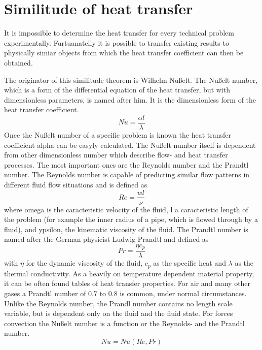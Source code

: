 \section{Similitude of heat transfer}
It is impossible to determine the heat transfer for every technical problem experimentally. Furtuanatelly it is possible to transfer existing results to physically simiar objects from which the heat transfer coefficient can then be obtained.

The originator of this similitude theorem is Wilhelm Nußelt. The Nußelt number, which is a form of the differential equation of the heat transfer, but with dimensionless parameters, is named after him. It is the dimensionless form of the heat transfer coefficient.
\begin{equation}
Nu = \frac{\alpha l}{\lambda}
\end{equation}
Once the Nußelt number of a specific problem is known the heat transfer coefficient alpha can be easyly calculated. The Nußelt number itself is dependent from other dimensionless number which describe flow- and heat transfer processes.
The most important ones are the Reynolds number and the Prandtl number. The Reynolds number is capable of predicting similar flow patterns in different fluid flow situations and is defined as 
\begin{equation}
Re = \frac{w l}{\nu}
\end{equation}
where omega is the caracteristic velocity of the fluid, l a caracteristic length of the problem (for example the inner radius of a pipe, which is flowed through by a fluid), and ypsilon, the kinematic viscosity of the fluid.
The Prandtl number is named after the German physicist Ludwig Prandtl and defined as
\begin{equation}
Pr = \frac{\eta c_p}{\lambda}
\end{equation}
with $\eta$ for the dynamic viscosity of the fluid, $c_p$ as the specific heat and $\lambda$ as the thermal conductivity. As a heavily on temperature dependent material property, it can be often found tables of heat transfer properties. For air and many other gases a Prandtl number of 0.7 to 0.8 is common, under normal circumstances. Unlike the Reynolds number, the Prandl number contains no length scale variable, but is dependent only on the fluid and the fluid state.
For forces convection the Nußelt number is a function or the Reynolds- and the Prandtl number.
\begin{equation}
Nu = Nu( Re, Pr )
\end{equation}
